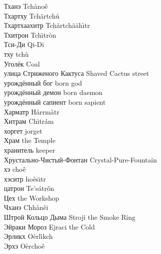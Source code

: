 \documentclass[a4paper,10pt]{book}
\begin{document}
Тханэ \hfill Tch\r{a}no\^{e}\\
Тхартху \hfill Tch\~{a}rtch\'{u}\\
Тхартхаахитр \hfill Tch\~{a}rtch\"{a}\={a}h\r{\i}tr\\
Тхитрон \hfill Tch\"{\i}tr\`{o}n\\
Тси-Ди \hfill Qi-Di\\
тху \hfill tch\`{u}\\
Уголёк \hfill Coal\\
улица Стриженого Кактуса \hfill Shaved Cactus street\\
урождённый бог \hfill born god\\
урождённый демон \hfill born daemon\\
урождённый сапиент \hfill born sapient\\
Харматр \hfill H\r{a}rrm\`{a}tr\\
Хитрам \hfill Ch\"{\i}tr\'{a}m\\
хоргет \hfill jorget\\
Храм \hfill the Temple\\
хранитель \hfill keeper\\
Хрустально-Чистый-Фонтан \hfill Crystal-Pure-Fountain\\
хэ \hfill cho\^{e}\\
хэситр \hfill ho\`{e}s\={\i}tr\\
цатрон \hfill Te's\'{a}tr\v{o}n\\
Цех \hfill the Workshop\\
Чханэ \hfill Chh\r{a}n\^{e}i\\
Штрой Кольцо Дыма \hfill Stroji the Smoke Ring\\
Эйраки Мороз \hfill Ejraci the Cold\\
Эрликх \hfill O\r{e}rl\'{\i}kch\\
Эрхэ \hfill O\r{e}rcho\^{e}\\
\end{document}
